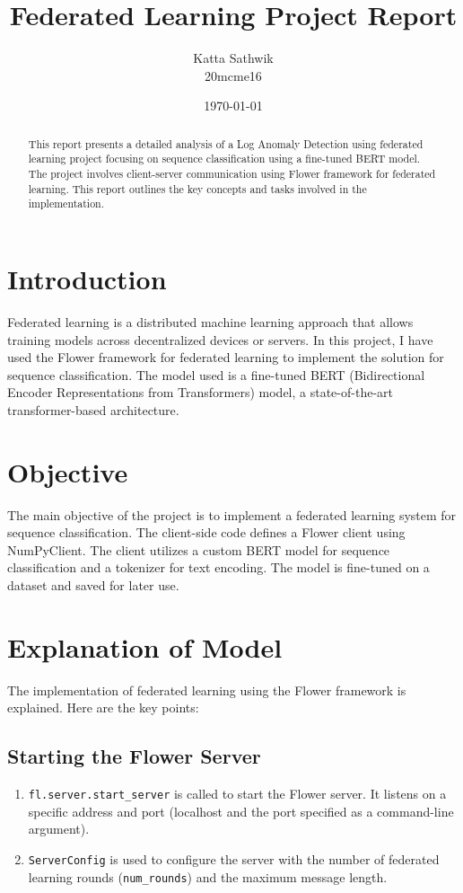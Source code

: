 \documentclass{article}
\begin{document}
\title{Federated Learning Project Report}
\author{Katta Sathwik \\ 20mcme16}
\date{\today}
\maketitle

\tableofcontents
\newpage

\begin{abstract}
    This report presents a detailed analysis of a Log Anomaly Detection using federated learning project focusing on sequence classification using a fine-tuned BERT model. The project involves client-server communication using Flower framework for federated learning. This report outlines the key concepts and tasks involved in the implementation.
\end{abstract}

\section{Introduction}
Federated learning is a distributed machine learning approach that allows training models across decentralized devices or servers. In this project, I have used the Flower framework for federated learning to implement the solution for sequence classification. The model used is a fine-tuned BERT (Bidirectional Encoder Representations from Transformers) model, a state-of-the-art transformer-based architecture.

\section{Objective}
The main objective of the project is to implement a federated learning system for sequence classification. The client-side code defines a Flower client using NumPyClient. The client utilizes a custom BERT model for sequence classification and a tokenizer for text encoding. The model is fine-tuned on a dataset and saved for later use.

\section{Explanation of Model}
The implementation of federated learning using the Flower framework is explained. Here are the key points:

\subsection{Starting the Flower Server}
\begin{enumerate}
    \item \texttt{fl.server.start\_server} is called to start the Flower server. It listens on a specific address and port (localhost and the port specified as a command-line argument).
    \item \texttt{ServerConfig} is used to configure the server with the number of federated learning rounds (\texttt{num\_rounds}) and the maximum message length.
\end{enumerate}
\end{document}
